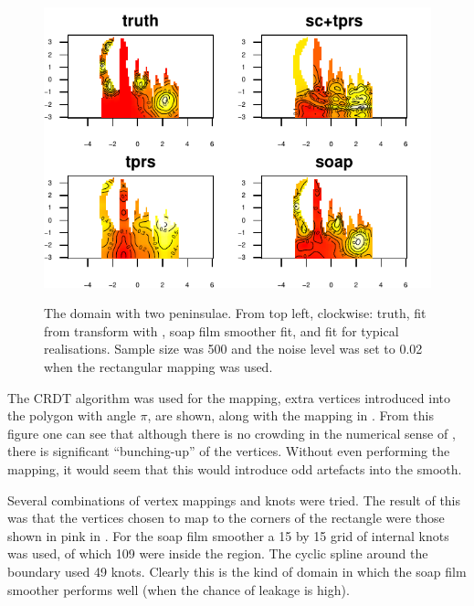 \begin{figure}
\centering
\includegraphics[width=6in]{sc/figs/wigglytop2-real.pdf} \\
\caption{The domain with two peninsulae. From top left, clockwise: truth, fit from \sch transform with \tprs, soap film smoother fit, and \tprs fit for typical realisations. Sample size was 500 and the noise level was set to 0.02 when the rectangular mapping was used.}
\label{sc-wigglytop2-real}
\end{figure}

The CRDT algorithm was used for the \sch mapping, extra vertices introduced into the polygon with angle $\pi$, are shown, along with the mapping in . From this figure one can see that although there is no crowding in the numerical sense of \cite{driscoll}, there is significant ``bunching-up'' of the vertices. Without even performing the mapping, it would seem that this would introduce odd artefacts into the smooth.

Several combinations of vertex mappings and knots were tried. The result of this was that the vertices chosen to map to the corners of the rectangle were those shown in pink in . For the soap film smoother a 15 by 15 grid of internal knots was used, of which 109 were inside the region. The cyclic spline around the boundary used 49 knots. Clearly this is the kind of domain in which the soap film smoother performs well (when the chance of leakage is high).

